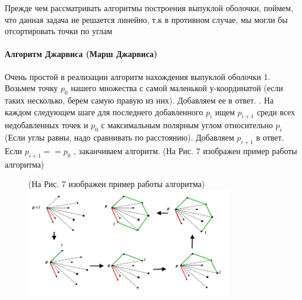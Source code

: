 Прежде чем рассматривать алгоритмы построения выпуклой оболочки, поймем, что данная задача не решается линейно, т.к в противном случае, мы могли бы отсортировать точки по углам

\paragraph*{Алгоритм Джарвиса (Марш Джарвиса)} Очень простой в реализации алгоритм нахождения выпуклой оболочки
\newline \newline
1. Возьмем точку $p_0$
нашего множества с самой маленькой $у$-координатой (если таких несколько, берем самую правую из них). Добавляем ее в ответ.  \newline{}. На каждом следующем шаге для последнего добавленного $p_i$
ищем $p_{i+1}$
среди всех недобавленных точек и $p_0$
с максимальным полярным углом относительно $p_i$
(Если углы равны, надо сравнивать по расстоянию). Добавляем $p_{i+1}$
в ответ. Если $p_{i+1}==p_0$
, заканчиваем алгоритм. (На Рис. 7 изображен пример работы алгоритма)
\begin{figure}[H] (На Рис. 7 изображен пример работы алгоритма)
    \centering
    \includegraphics[width = 9cm]{Jarvis.png}
    \caption{}
    \label{fig:float}
\end{figure}

